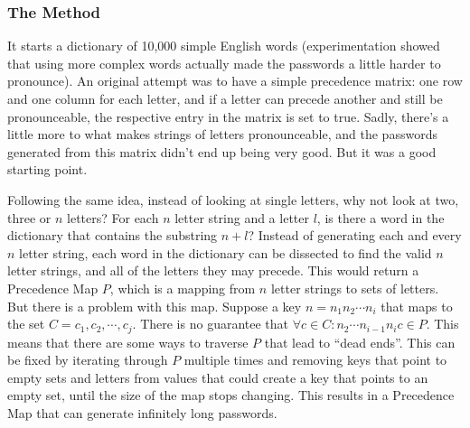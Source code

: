 \documentclass{article}
\begin{document}
\subsubsection{The Method}
\par It starts a dictionary of 10,000 simple English words (experimentation showed that using more complex words actually made the passwords a little harder to pronounce). An original attempt was to have a simple precedence matrix: one row and one column for each letter, and if a letter can precede another and still be pronounceable, the respective entry in the matrix is set to true. Sadly, there's a little more to what makes strings of letters pronounceable, and the passwords generated from this matrix didn't end up being very good. But it was a good starting point.
\par Following the same idea, instead of looking at single letters, why not look at two, three or $n$ letters? For each $n$ letter string and a letter $l$, is there a word in the dictionary that contains the substring $n + l$? Instead of generating each and every $n$ letter string, each word in the dictionary can be dissected to find the valid $n$ letter strings, and all of the letters they may precede. This would return a Precedence Map $P$, which is a mapping from $n$ letter strings to sets of letters. But there is a problem with this map. Suppose a key $n = n_1 n_2 \cdots n_i$ that maps to the set $C = {c_1, c_2, \cdots, c_j}$. There is no guarantee that $\forall c \in C: n_2 \cdots n_{i-1} n_i c \in P$. This means that there are some ways to traverse $P$ that lead to ``dead ends''. This can be fixed by iterating through $P$ multiple times and removing keys that point to empty sets and letters from values that could create a key that points to an empty set, until the size of the map stops changing. This results in a Precedence Map that can generate infinitely long passwords.
\end{document}
